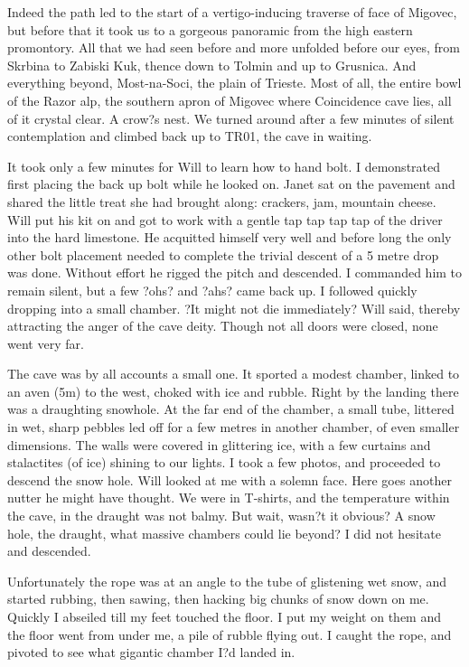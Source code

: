 \documentclass[onecolumn]{book}
\begin{document}
Indeed the path led to the start of a vertigo-inducing traverse of face of Migovec, but before that it took us to a gorgeous panoramic from the high eastern promontory. All that we had seen before and more unfolded before our eyes, from Skrbina to Zabiski Kuk, thence down to Tolmin and up to Grusnica. And everything beyond, Most-na-Soci, the plain of Trieste. Most of all, the entire bowl of the Razor alp, the southern apron of Migovec where Coincidence cave lies, all of it crystal clear. A crow?s nest. We turned around after a few minutes of silent contemplation and climbed back up to TR01, the cave in waiting. 

It took only a few minutes for Will to learn how to hand bolt. I demonstrated first placing the back up bolt while he looked on. Janet sat on the pavement and shared the little treat she had brought along: crackers, jam, mountain cheese. Will put his kit on and got to work with a gentle tap tap tap tap  of the driver into the hard limestone. He acquitted himself very well and before long the only other bolt placement needed to complete the trivial descent of a 5 metre drop was done. Without effort he rigged the pitch and descended. I commanded him to remain silent, but a few ?ohs? and ?ahs? came back up. I followed quickly dropping into a small chamber.
?It might not die immediately? Will said, thereby attracting the anger of the cave deity. Though not all doors were closed, none went very far. 

The cave was by all accounts a small one. It sported a modest chamber, linked to an aven (5m) to the west, choked with ice and rubble. Right by the landing there was a draughting snowhole. At the far end of the chamber, a small tube, littered in wet, sharp pebbles led off for  a few metres in another chamber, of even smaller dimensions. The walls were covered in glittering ice, with a few curtains and stalactites (of ice) shining to our lights. I took a few photos, and proceeded to descend the snow hole. Will looked at me with a solemn face. Here goes another nutter he might have thought. We were in T-shirts, and the temperature within the cave, in the draught was not balmy. But wait, wasn?t it obvious? A snow hole, the draught, what massive chambers could lie beyond? I did not hesitate and descended.

Unfortunately the rope was at an angle to the tube of glistening wet snow, and started rubbing, then sawing, then hacking big chunks of snow down on me. Quickly I abseiled till my feet touched the floor. I put my weight on them and the floor went from under me, a pile of rubble flying out. I caught the rope, and pivoted to see what gigantic chamber I?d landed in. 
\end{document}
